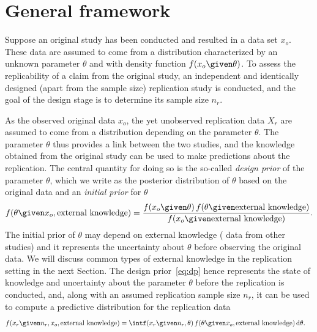 \section{General framework} \label{sec:GFW}

Suppose an original study has been conducted and resulted in a data set $x_{o}$.
These data are assumed to come from a distribution characterized by an unknown
parameter $\theta$ and with density function $f(x_{o} \given \theta)$. To assess
the replicability of a claim from the original study, an independent and
identically designed (apart from the sample size) replication study is
conducted, and the goal of the design stage is to determine its sample size
$n_{r}$.

As the observed original data $x_{o}$, the yet unobserved replication data
$X_{r}$ are assumed to come from a distribution depending on the parameter
$\theta$. The parameter $\theta$ thus provides a link between the two studies,
and the knowledge obtained from the original study can be used to make
predictions about the replication. The central quantity for doing so is the
so-called \emph{design prior} of the parameter $\theta$, which we write as the
posterior distribution of $\theta$ based on the original data and an
\emph{initial prior} for $\theta$
\begin{align}
  \label{eq:dp}
  f(\theta \given x_o, \text{external knowledge}) =
  \frac{f(x_o \given \theta) \, f(\theta \given \text{external knowledge})}{f(x_o \given
  \text{external knowledge})}.
\end{align}
The initial prior of $\theta$ may depend on external knowledge (\eg{} data from
other studies) and it represents the uncertainty about $\theta$ before observing
the original data. We will discuss common types of external knowledge in the
replication setting in the next Section. %
The design prior~\eqref{eq:dp} hence represents the state of knowledge and
uncertainty about the parameter $\theta$ before the replication is conducted,
and, along with an assumed replication sample size $n_{r}$, it can be used to
compute a predictive distribution for the replication data
\begin{align}
  \label{eq:ftr}
  f(x_r \given n_r, x_o, \text{external knowledge})
  &= \int%
    f(x_r \given n_{r}, \theta)
    \, f(\theta \given x_o, \text{external knowledge})
    \, \text{d}\theta.
\end{align}


